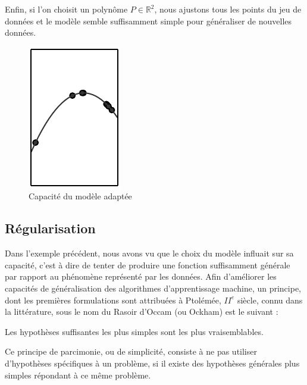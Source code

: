 \documentclass[a4paper, 11pt]{report}
\begin{document}
Enfin, si l'on choisit un polynôme $P \in \mathbb{R}^2$, nous ajustons tous les points du jeu de données et le modèle semble suffisamment simple pour généraliser de nouvelles données.
\begin{figure}[H]
	\begin{center}
		\includegraphics[scale=0.5]{Images/Good_Fitting.png}
		\caption{Capacité du modèle adaptée}
	\end{center}
\end{figure}
		
\subsection{Régularisation}
Dans l'exemple précédent, nous avons vu que le choix du modèle influait sur sa capacité, c'est à dire de tenter de produire une fonction suffisamment générale par rapport au phénomène représenté par les données.
Afin d'améliorer les capacités de généralisation des algorithmes d'apprentissage machine, un principe, dont les premières formulations sont attribuées à Ptolémée, $II^e$ siècle, connu dans la littérature, sous le nom du Rasoir d'Occam (ou Ockham) est le suivant : 
\begin{displayquote}
	Les hypothèses suffisantes les plus simples sont les plus vraisemblables.
\end{displayquote}
Ce principe de parcimonie, ou de simplicité, consiste à ne pas utiliser d'hypothèses spécifiques à un problème, si il existe des hypothèses générales plus simples répondant à ce même problème.
\end{document}
